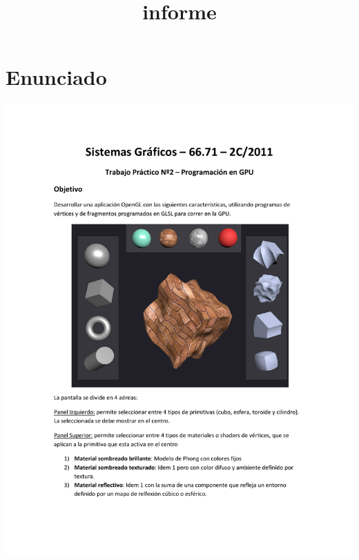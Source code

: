 \documentclass[11pt]{article}
\title{informe}
\author{}
\begin{document}


\pagestyle{fancy}
\renewcommand{\sectionmark}[1]{\markboth{}{\thesection\ \ #1}}
\lhead{}
\chead{}
\rhead{\rightmark}
\lfoot{}
\cfoot{}
\rfoot{\thepage}


\setcounter{page}{1}

\tableofcontents
\newpage


\section{Enunciado}

\begin{center}
\includegraphics[trim = 25mm 30mm 10mm 35mm, clip,height=0.93\textheight,width=1.04\textwidth]{tp2-c2-2011.pdf}

\end{center}
\end{document}
